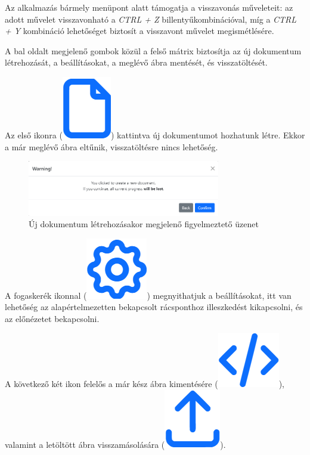 Az alkalmazás bármely menüpont alatt támogatja a visszavonás műveleteit: az adott művelet visszavonható a \textit{CTRL + Z} billentyűkombinációval, míg a \textit{CTRL + Y} kombináció lehetőséget biztosít a visszavont művelet megismétlésére. 


A bal oldalt megjelenő gombok közül a felső mátrix biztosítja az új dokumentum létrehozását, a beállításokat, a meglévő ábra mentését, és visszatöltését.

Az első ikonra 
(\includegraphics[height=\fontcharht\font`\B]{images/new.png})
kattintva új dokumentumot hozhatunk létre. Ekkor a már meglévő ábra eltűnik, visszatöltésre nincs lehetőség.

\begin{figure}[!h]
	\label{fig:new}
	\centering
	\includegraphics[width=0.75\textwidth]{images/new_modal.png}
	\caption{Új dokumentum létrehozásakor megjelenő figyelmeztető üzenet}
\end{figure}

A fogaskerék ikonnal 
(\includegraphics[height=\fontcharht\font`\B]{images/settings.png})
megnyithatjuk a beállításokat, itt van lehetőség az alapértelmezetten bekapcsolt rácsponthoz illeszkedést kikapcsolni, és az előnézetet bekapcsolni.

A következő két ikon felelős a már kész ábra kimentésére 
(\includegraphics[height=\fontcharht\font`\B]{images/save.png}),
valamint a letöltött ábra visszamásolására
(\includegraphics[height=\fontcharht\font`\B]{images/load.png}).

